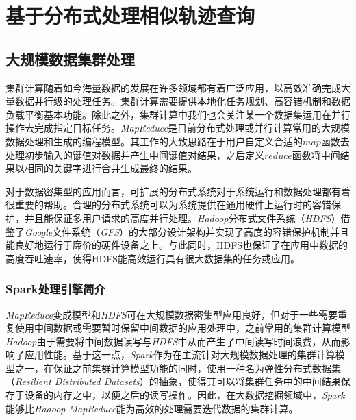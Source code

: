

\chapter{基于分布式处理相似轨迹查询}
\label{chap:distributed}

\section{大规模数据集群处理}
\label{sec:bigdata-intro}
集群计算随着如今海量数据的发展在许多领域都有着广泛应用，以高效准确完成大量数据并行级的处理任务。集群计算需要提供本地化任务规划、高容错机制和数据负载平衡基本功能。除此之外，集群计算中我们也会关注某一个数据集运用在并行操作去完成指定目标任务。\emph{MapReduce}是目前分布式处理或并行计算常用的大规模数据处理和生成的编程模型。其工作的大致思路在于用户自定义合适的$map$函数去处理初步输入的键值对数据并产生中间键值对结果，之后定义$reduce$函数将中间结果以相同的关键字进行合并生成最终的结果。

对于数据密集型的应用而言，可扩展的分布式系统对于系统运行和数据处理都有着很重要的帮助。合理的分布式系统可以为系统提供在通用硬件上运行时的容错保护，并且能保证多用户请求的高度并行处理。\emph{Hadoop}分布式文件系统（\emph{HDFS}）借鉴了\emph{Google}文件系统（\emph{GFS}）的大部分设计架构并实现了高度的容错保护机制并且能良好地运行于廉价的硬件设备之上。与此同时，HDFS也保证了在应用中数据的高度吞吐速率，使得HDFS能高效运行具有很大数据集的任务或应用。

\subsection{Spark处理引擎简介}
\label{subsec:spark}
\emph{MapReduce}变成模型和\emph{HDFS}可在大规模数据密集型应用良好，但对于一些需要重复使用中间数据或需要暂时保留中间数据的应用处理中，之前常用的集群计算模型\emph{Hadoop}由于需要将中间数据读写与\emph{HDFS}中从而产生了中间读写时间浪费，从而影响了应用性能。基于这一点，\emph{Spark}作为在主流针对大规模数据处理的集群计算模型之一，在保证之前集群计算模型功能的同时，使用一种名为弹性分布式数据集（\emph{Resilient Distributed Datasets}）的抽象，使得其可以将集群任务中的中间结果保存于设备的内存之中，以便之后的读写操作。因此，在大数据挖掘领域中，\emph{Spark}能够比\emph{Hadoop MapReduce}能为高效的处理需要迭代数据的集群计算。

